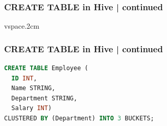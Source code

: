 \begin{frame}
\frametitle{CREATE TABLE in Hive | continued}
\begin{tcolorbox}[colback=white,colframe=black,title= Part 9: Clustering and Sorting | CLUSTERED BY]
	\small
	vspace{.2cm}
	\begin{table}[h!]
		\centering
		\caption{Sample data for employee table}
	\end{table}
\end{tcolorbox}
\end{frame}
\begin{frame}[fragile]
\frametitle{CREATE TABLE in Hive | continued}	
\begin{tcolorbox}[colback=white,colframe=black,title= Part 9: Clustering and Sorting | CLUSTERED BY]
\small
\begin{lstlisting}[caption={Create CLUSTERED Table},language=SQL]
CREATE TABLE Employee (
  ID INT,
  Name STRING,
  Department STRING,
  Salary INT)
CLUSTERED BY (Department) INTO 3 BUCKETS;
\end{lstlisting}
\end{tcolorbox}
\end{frame}

